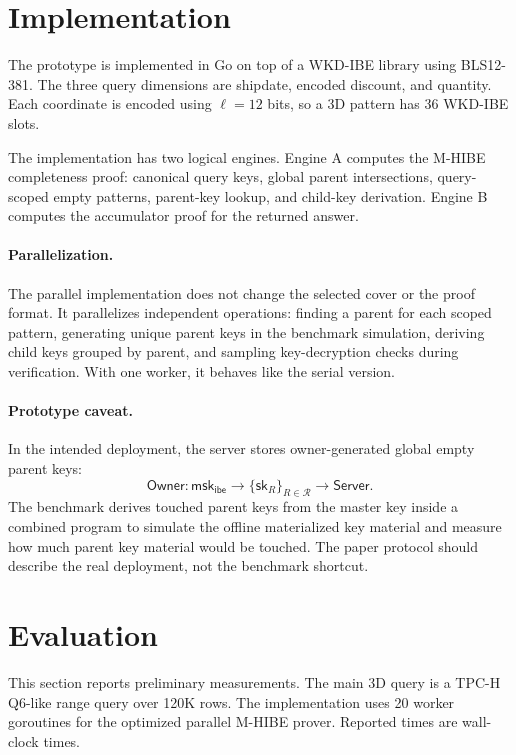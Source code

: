 \documentclass[11pt]{article}
\newcommand{\msk}{\mathsf{msk}}
\newcommand{\sk}{\mathsf{sk}}
\begin{document}
\section{Implementation}

The prototype is implemented in Go on top of a WKD-IBE library using BLS12-381. The three query dimensions are shipdate, encoded discount, and quantity. Each coordinate is encoded using $\ell=12$ bits, so a 3D pattern has 36 WKD-IBE slots.

The implementation has two logical engines. Engine A computes the M-HIBE completeness proof: canonical query keys, global parent intersections, query-scoped empty patterns, parent-key lookup, and child-key derivation. Engine B computes the accumulator proof for the returned answer.

\paragraph{Parallelization.}
The parallel implementation does not change the selected cover or the proof format. It parallelizes independent operations: finding a parent for each scoped pattern, generating unique parent keys in the benchmark simulation, deriving child keys grouped by parent, and sampling key-decryption checks during verification. With one worker, it behaves like the serial version.

\paragraph{Prototype caveat.}
In the intended deployment, the server stores owner-generated global empty parent keys:
\[
  \mathsf{Owner}: \msk_{\mathsf{ibe}}
  \rightarrow
  \{\sk_R\}_{R\in\mathcal{R}}
  \rightarrow
  \mathsf{Server}.
\]
The benchmark derives touched parent keys from the master key inside a combined program to simulate the offline materialized key material and measure how much parent key material would be touched. The paper protocol should describe the real deployment, not the benchmark shortcut.

\section{Evaluation}

This section reports preliminary measurements. The main 3D query is a TPC-H Q6-like range query over 120K rows. The implementation uses 20 worker goroutines for the optimized parallel M-HIBE prover. Reported times are wall-clock times.
\end{document}
